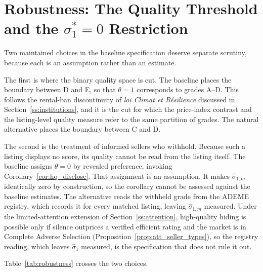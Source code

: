 
\section{Robustness: The Quality Threshold and the $\sigma_1^*=0$ Restriction}
\label{app:robustness}

Two maintained choices in the baseline specification deserve separate scrutiny, because each
is an assumption rather than an estimate.

The first is where the binary quality space is cut. The baseline places the boundary between
D and E, so that $\theta=1$ corresponds to grades A--D. This follows the rental-ban
discontinuity of \emph{loi Climat et R\'esilience} discussed in
Section~\ref{ss:institutions}, and it is the cut for which the price-index contrast and the
listing-level quality measure refer to the same partition of grades. The natural alternative
places the boundary between C and D.

The second is the treatment of informed sellers who withhold. Because such a listing displays
no score, its quality cannot be read from the listing itself. The baseline assigns
$\theta=0$ by revealed preference, invoking Corollary~\ref{cor:hq_disclose}. That assignment
is an assumption. It makes
$\hat\sigma_{1,m}$ identically zero by construction, so the corollary cannot be assessed
against the baseline estimates. The alternative reads the withheld grade from the ADEME
registry, which records it for every matched listing, leaving $\hat\sigma_{1,m}$ measured. Under the limited-attention extension of Section~\ref{ss:attention}, high-quality hiding is possible only if silence outprices a verified efficient rating and the market is in Complete Adverse Selection (Proposition~\ref{prop:att_seller_types}), so the registry reading, which leaves $\hat\sigma_1$ measured, is the specification that does not rule it out.

Table~\ref{tab:robustness} crosses the two choices.


